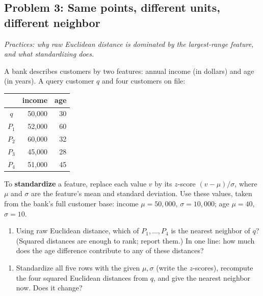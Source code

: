 \documentclass[
  11pt,
]{article}
\newcounter{none} %
\providecommand{\tightlist}{%
  \setlength{\itemsep}{0pt}\setlength{\parskip}{0pt}}
\newcommand{\answerpage}{\clearpage}
\begin{document}
\answerpage

\subsection{Problem 3: Same points, different units, different
neighbor}\label{problem-3-same-points-different-units-different-neighbor}

\emph{Practices: why raw Euclidean distance is dominated by the
largest-range feature, and what standardizing does.}

A bank describes customers by two features: annual income (in dollars)
and age (in years). A query customer \(q\) and four customers on file:

{\def\LTcaptype{none} %
\begin{longtable}[]{@{}crr@{}}
\toprule\noalign{}
& income & age \\
\midrule\noalign{}
\endhead
\bottomrule\noalign{}
\endlastfoot
\(q\) & 50,000 & 30 \\
\(P_1\) & 52,000 & 60 \\
\(P_2\) & 60,000 & 32 \\
\(P_3\) & 45,000 & 28 \\
\(P_4\) & 51,000 & 45 \\
\end{longtable}
}

To \textbf{standardize} a feature, replace each value \(v\) by its
\(z\)-score \((v-\mu)/\sigma\), where \(\mu\) and \(\sigma\) are the
feature's mean and standard deviation. Use these values, taken from the
bank's full customer base: income \(\mu = 50{,}000\),
\(\sigma = 10{,}000\); age \(\mu = 40\), \(\sigma = 10\).

\begin{enumerate}
\def\labelenumi{(\alph{enumi})}
\tightlist
\item
  Using raw Euclidean distance, which of \(P_1,\dots,P_4\) is the
  nearest neighbor of \(q\)? (Squared distances are enough to rank;
  report them.) In one line: how much does the age difference contribute
  to any of these distances?
\end{enumerate}

\begin{enumerate}
\def\labelenumi{(\alph{enumi})}
\setcounter{enumi}{1}
\tightlist
\item
  Standardize all five rows with the given \(\mu,\sigma\) (write the
  \(z\)-scores), recompute the four squared Euclidean distances from
  \(q\), and give the nearest neighbor now. Does it change?
\end{enumerate}
\end{document}
